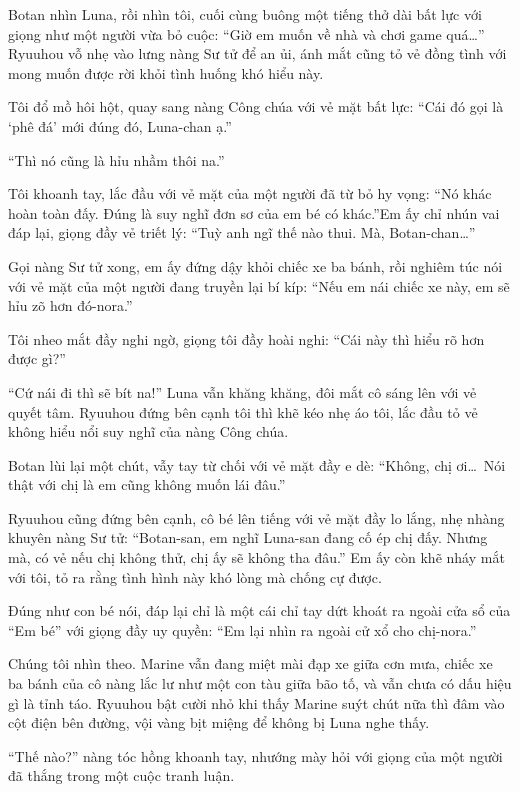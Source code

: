\documentclass[../main.tex]{subfiles}
\begin{document}
Botan nhìn Luna, rồi nhìn tôi, cuối cùng buông một tiếng thở dài bất lực với giọng như một người vừa bỏ cuộc: ``Giờ em muốn về nhà và chơi game quá\dots'' Ryuuhou vỗ nhẹ vào lưng nàng Sư tử để an ủi, ánh mắt cũng tỏ vẻ đồng tình với mong muốn được rời khỏi tình huống khó hiểu này.

Tôi đổ mồ hôi hột, quay sang nàng Công chúa với vẻ mặt bất lực: ``Cái đó gọi là `phê đá' mới đúng đó, Luna-chan ạ.''

``Thì nó cũng là hỉu nhầm thôi na.''

Tôi khoanh tay, lắc đầu với vẻ mặt của một người đã từ bỏ hy vọng: ``Nó khác hoàn toàn đấy. Đúng là suy nghĩ đơn sơ của em bé có khác.''Em ấy chỉ nhún vai đáp lại, giọng đầy vẻ triết lý: ``Tuỳ anh ngĩ thế nào thui. Mà, Botan-chan\dots''

Gọi nàng Sư tử xong, em ấy đứng dậy khỏi chiếc xe ba bánh, rồi nghiêm túc nói với vẻ mặt của một người đang truyền lại bí kíp: ``Nếu em nái chiếc xe này, em sẽ hỉu zõ hơn đó-nora.''

Tôi nheo mắt đầy nghi ngờ, giọng tôi đầy hoài nghi: ``Cái này thì hiểu rõ hơn được gì?''

``Cứ nái đi thì sẽ bít na!'' Luna vẫn khăng khăng, đôi mắt cô sáng lên với vẻ quyết tâm. Ryuuhou đứng bên cạnh tôi thì khẽ kéo nhẹ áo tôi, lắc đầu tỏ vẻ không hiểu nổi suy nghĩ của nàng Công chúa.

Botan lùi lại một chút, vẫy tay từ chối với vẻ mặt đầy e dè: ``Không, chị ơi\dots\ Nói thật với chị là em cũng không muốn lái đâu.''

Ryuuhou cũng đứng bên cạnh, cô bé lên tiếng với vẻ mặt đầy lo lắng, nhẹ nhàng khuyên nàng Sư tử: ``Botan-san, em nghĩ Luna-san đang cố ép chị đấy. Nhưng mà, có vẻ nếu chị không thử, chị ấy sẽ không tha đâu.'' Em ấy còn khẽ nháy mắt với tôi, tỏ ra rằng tình hình này khó lòng mà chống cự được.

Đúng như con bé nói, đáp lại chỉ là một cái chỉ tay dứt khoát ra ngoài cửa sổ của ``Em bé'' với giọng đầy uy quyền: ``Em lại nhìn ra ngoài cử xổ cho chị-nora.''

Chúng tôi nhìn theo. Marine vẫn đang miệt mài đạp xe giữa cơn mưa, chiếc xe ba bánh của cô nàng lắc lư như một con tàu giữa bão tố, và vẫn chưa có dấu hiệu gì là tỉnh táo. Ryuuhou bật cười nhỏ khi thấy Marine suýt chút nữa thì đâm vào cột điện bên đường, vội vàng bịt miệng để không bị Luna nghe thấy.

``Thế nào?'' nàng tóc hồng khoanh tay, nhướng mày hỏi với giọng của một người đã thắng trong một cuộc tranh luận.
\end{document}

